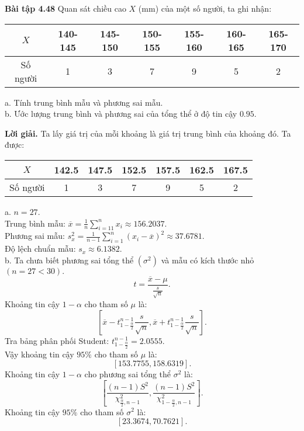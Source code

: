 \documentclass[12pt,a4paper]{article}
\begin{document}
\begin{mybox}
\textbf{Bài tập 4.48} Quan sát chiều cao $X$ ($\mathrm{mm}$) của một số người, ta ghi nhận: 
\begin{table}[H]
\begin{tabular}{|c|c|c|c|c|c|c|}
\hline 
$X$ & 140-145 & 145-150 & 150-155 & 155-160 & 160-165 & 165-170 \\ 
\hline 
Số người & 1 & 3 & 7 & 9 & 5 & 2 \\ 
\hline 
\end{tabular} 
\end{table}
a. Tính trung bình mẫu và phương sai mẫu.\\
b. Ước lượng trung bình và phương sai của tổng thể ở độ tin cậy $0.95.$
\end{mybox}
\textbf{Lời giải.} Ta lấy giá trị của mỗi khoảng là giá trị trung bình của khoảng đó. Ta được:
\begin{table}[H]
\begin{tabular}{|c|c|c|c|c|c|c|}
\hline 
$X$ & 142.5 & 147.5 & 152.5 & 157.5 & 162.5 & 167.5 \\ 
\hline 
Số người & 1 & 3 & 7 & 9 & 5 & 2 \\ 
\hline 
\end{tabular} 
\end{table}
a. $n = 27.$\\
Trung bình mẫu:
$\overline x  = \frac{1}{n}\sum\limits_{i =1 1}^n {{x_i}}  \approx 156.2037.$\\
Phương sai mẫu: $s_x^2 = \frac{1}{{n - 1}}\sum\limits_{i = 1}^n {{{\left( {{x_i} - \overline x } \right)}^2}}  \approx 37.6781.$\\
Độ lệch chuẩn mẫu: ${s_x} \approx 6.1382.$\\
b. Ta chưa biết phương sai tổng thể $\left( {\sigma^2} \right)$ và mẫu có kích thước nhỏ $\left( {n = 27 < 30} \right).$
$$t = \frac{\overline{x} - \mu}{\frac{s}{\sqrt{n}}}.$$
Khoảng tin cậy $1 - \alpha$ cho tham số $\mu$ là:
$$\left[ {\overline x  - t_{1 - \frac{\alpha }{2}}^{n - 1}\frac{s}{{\sqrt n }},\overline x  + t_{1 - \frac{\alpha }{2}}^{n - 1}\frac{s}{{\sqrt n }}} \right].$$
Tra bảng phân phối Student: $t_{1 - \frac{\alpha }{2}}^{n - 1} = 2.0555.$\\
Vậy khoảng tin cậy $95\%$ cho tham số $\mu$ là:
$$\left[ {153.7755, 158.6319} \right].$$
Khoảng tin cậy $1 - \alpha$ cho phương sai tổng thể $\sigma^2$ là:
$$\left[ {\frac{{\left( {n - 1} \right){S^2}}}{{\chi _{\frac{\alpha }{2},n - 1}^2}},\frac{{\left( {n - 1} \right){S^2}}}{{\chi _{1 - \frac{\alpha }{2},n - 1}^2}}} \right].$$
Khoảng tin cậy $95\%$ cho tham số $\sigma^2$ là:
$$\left[ {23.3674, 70.7621} \right].$$
\end{document}
